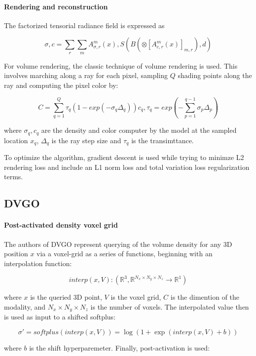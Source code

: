 \documentclass[conference]{IEEEtran}
\begin{document}
\paragraph{Rendering and reconstruction}

The factorized tensorial radiance field is expressed as

\[\sigma, c = \sum_r \sum_m A_{\sigma, r}^m(x), S(B(\otimes[A_{c,r}^m(x)]_{m,r}), d)\]

For volume rendering, the classic technique of volume rendering is used. This
involves marching along a ray for each pixel, sampling \(Q\) shading points along
the ray and computing the pixel color by:

\[C = \sum_{q=1}^{Q} \tau_q(1 - exp(-\sigma_q \Delta_q))c_q, \tau_q = exp(-\sum_{p=1}^{q-1} \sigma_p \Delta_p)\]

where \(\sigma_q, c_q\) are the density and color computer by the model at the sampled location \(x_q\), \(\Delta_q\) is the ray step size and \(\tau_q\) is the transimttance.

To optimize the algorithm, gradient descent is used while trying to minimze L2 rendering
loss and include an L1 norm loss and total variation loss regularization terms.

\subsection{DVGO}

\paragraph{Post-activated density voxel grid}

The authors of DVGO represent querying of the volume density
for any 3D position \(x\)
via a voxel-grid as a series of functions, beginning with an interpolation function:

\[interp(x,V): (\mathbb{R}^3, \mathbb{R}^{N_x \times N_y \times N_z} \rightarrow \mathbb{R}^1)\]

where \(x\) is the queried 3D point, \(V\) is the voxel grid, \(C\) is the dimention of the modality, and \(N_x \times N_y \times N_z\) is the number of voxels. The interpolated
value then is used as input to a shifted softplus:

\[\sigma' = softplus(interp(x,V)) = \log(1 + \exp(interp(x,V) + b))\]

where \(b\) is the shift hyperparemeter. Finally, post-activation is used:
\end{document}
